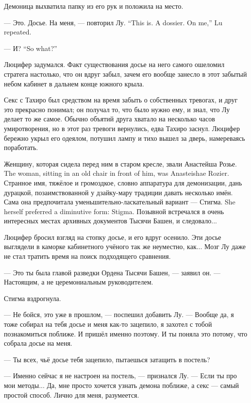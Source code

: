 Демоница выхватила папку из его рук и положила на место.

{--- Это. Досье. На меня, --- повторил Лу.}
{``This is. A dossier. On me,'' Lu repeated.}

{--- И?}
{``So what?''}

Люцифер задумался.
Факт существования досье на него самого ошеломил стратега настолько, что он вдруг забыл, зачем его вообще занесло в этот забытый небом кабинет в дальнем конце южного крыла.

Секс с Тахиро был средством на время забыть о собственных тревогах, и друг это прекрасно понимал;
он получал то, что было нужно ему, и знал, что Лу делает то же самое.
Обычно объятий друга хватало на несколько часов умиротворения, но в этот раз тревоги вернулись, едва Тахиро заснул.
Люцифер бережно укрыл его одеялом, потушил лампу и тихо вышел за дверь, намереваясь поработать.

{Женщину, которая сидела перед ним в старом кресле, звали Анастейша Розье.}
{The woman, sitting in an old chair in front of him, was Anasteishae Rozier.}
Странное имя, тяжёлое и громоздкое, словно аппаратура для демонизации, дань дурацкой, позаимствованной у дзайку-мару традиции давать несколько имён.
{Сама она предпочитала уменьшительно-ласкательный вариант --- Стигма.}
{She herself preferred a diminutive form: Stigma.}
Позывной встречался в очень интересных местах архивных документов Тысячи Башен, и следовало...

Люцифер бросил взгляд на стопку досье, и его вдруг осенило.
Эти досье выглядели в каморке кабинетного учёного так же неуместно, как...
Мозг Лу даже не стал тратить время на поиск подходящего сравнения.

--- Это ты была главой разведки Ордена Тысячи Башен, --- заявил он.
--- Настоящим, а не церемониальным руководителем.

Стигма вздрогнула.

--- Не бойся, это уже в прошлом, --- поспешил добавить Лу.
--- Вообще да, я тоже собирал на тебя досье и меня как-то зацепило, я захотел с тобой познакомиться поближе.
И пришёл именно поэтому.
И ты поняла это потому, что собрала досье на меня.

--- Ты всех, чьё досье тебя зацепило, пытаешься затащить в постель?

--- Именно сейчас я не настроен на постель, --- признался Лу.
--- Если ты про мои методы...
Да, мне просто хочется узнать демона поближе, а секс --- самый простой способ.
Лично для меня, разумеется.

